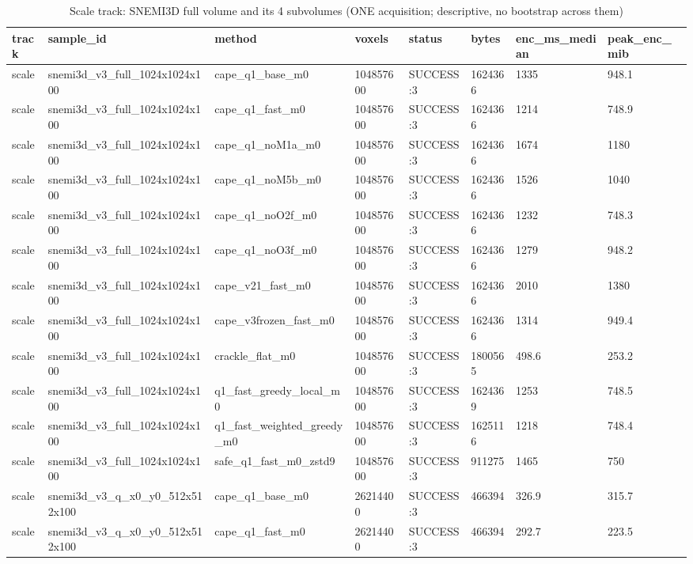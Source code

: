 \begin{table}[t]\centering\scriptsize
\caption{Scale track: SNEMI3D full volume and its 4 subvolumes (ONE acquisition; descriptive, no bootstrap across them)}\label{tab:T04}
\begin{tabular}{llllllll}
\hline
track & sample\_id & method & voxels & status & bytes & enc\_ms\_median & peak\_enc\_mib \\ \hline
scale & snemi3d\_v3\_full\_1024x1024x100 & cape\_q1\_base\_m0 & 104857600 & SUCCESS:3 & 1624366 & 1335 & 948.1 \\
scale & snemi3d\_v3\_full\_1024x1024x100 & cape\_q1\_fast\_m0 & 104857600 & SUCCESS:3 & 1624366 & 1214 & 748.9 \\
scale & snemi3d\_v3\_full\_1024x1024x100 & cape\_q1\_noM1a\_m0 & 104857600 & SUCCESS:3 & 1624366 & 1674 & 1180 \\
scale & snemi3d\_v3\_full\_1024x1024x100 & cape\_q1\_noM5b\_m0 & 104857600 & SUCCESS:3 & 1624366 & 1526 & 1040 \\
scale & snemi3d\_v3\_full\_1024x1024x100 & cape\_q1\_noO2f\_m0 & 104857600 & SUCCESS:3 & 1624366 & 1232 & 748.3 \\
scale & snemi3d\_v3\_full\_1024x1024x100 & cape\_q1\_noO3f\_m0 & 104857600 & SUCCESS:3 & 1624366 & 1279 & 948.2 \\
scale & snemi3d\_v3\_full\_1024x1024x100 & cape\_v21\_fast\_m0 & 104857600 & SUCCESS:3 & 1624366 & 2010 & 1380 \\
scale & snemi3d\_v3\_full\_1024x1024x100 & cape\_v3frozen\_fast\_m0 & 104857600 & SUCCESS:3 & 1624366 & 1314 & 949.4 \\
scale & snemi3d\_v3\_full\_1024x1024x100 & crackle\_flat\_m0 & 104857600 & SUCCESS:3 & 1800565 & 498.6 & 253.2 \\
scale & snemi3d\_v3\_full\_1024x1024x100 & q1\_fast\_greedy\_local\_m0 & 104857600 & SUCCESS:3 & 1624369 & 1253 & 748.5 \\
scale & snemi3d\_v3\_full\_1024x1024x100 & q1\_fast\_weighted\_greedy\_m0 & 104857600 & SUCCESS:3 & 1625116 & 1218 & 748.4 \\
scale & snemi3d\_v3\_full\_1024x1024x100 & safe\_q1\_fast\_m0\_zstd9 & 104857600 & SUCCESS:3 & 911275 & 1465 & 750 \\
scale & snemi3d\_v3\_q\_x0\_y0\_512x512x100 & cape\_q1\_base\_m0 & 26214400 & SUCCESS:3 & 466394 & 326.9 & 315.7 \\
scale & snemi3d\_v3\_q\_x0\_y0\_512x512x100 & cape\_q1\_fast\_m0 & 26214400 & SUCCESS:3 & 466394 & 292.7 & 223.5 \\

\end{tabular}
\end{table}
